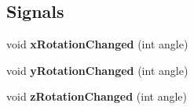 \subsection*{Signals}
\begin{DoxyCompactItemize}
\item 
\hypertarget{class_g_l_widget_a3a557b9cd96f7b89661ceaa567c91640}{}void {\bfseries x\+Rotation\+Changed} (int angle)\label{class_g_l_widget_a3a557b9cd96f7b89661ceaa567c91640}

\item 
\hypertarget{class_g_l_widget_ad47d672d0124b995e82551a95b59badb}{}void {\bfseries y\+Rotation\+Changed} (int angle)\label{class_g_l_widget_ad47d672d0124b995e82551a95b59badb}

\item 
\hypertarget{class_g_l_widget_ab2035753b19b46105020d6045ac75a79}{}void {\bfseries z\+Rotation\+Changed} (int angle)\label{class_g_l_widget_ab2035753b19b46105020d6045ac75a79}

\end{DoxyCompactItemize}
